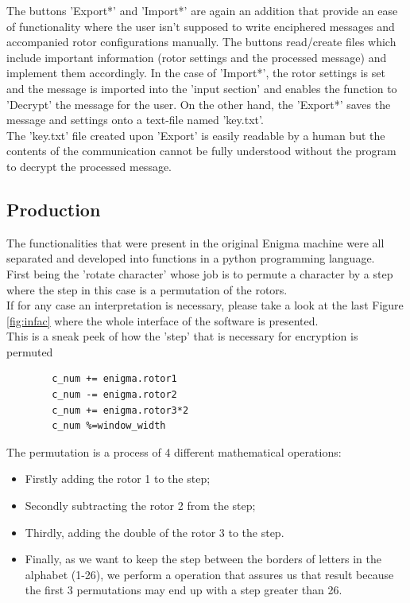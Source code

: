 \documentclass[conference,compsoc]{IEEEtran}
\begin{document}
The buttons 'Export*' and 'Import*' are again an addition that provide an ease of functionality where the user isn't supposed to write enciphered messages and accompanied rotor configurations manually. The buttons read/create files which include important information (rotor settings and the processed message) and implement them accordingly. In the case of 'Import*', the rotor settings is set and the message is imported into the 'input section' and enables the function to 'Decrypt' the message for the user. On the other hand, the 'Export*' saves the message and settings onto a text-file named 'key.txt'.\\

The 'key.txt' file created upon 'Export' is easily readable by a human but the contents of the communication cannot be fully understood without the program to decrypt the processed message.\\ 

\subsection{Production}

The functionalities that were present in the original Enigma machine were all separated and developed into functions in a python programming language.\\
First being the 'rotate character' whose job is to permute a character by a step where the step in this case is a permutation of the rotors.\\
If for any case an interpretation is necessary, please take a look at the last Figure \ref{fig:infac} where the whole interface of the software is presented.\\

This is a sneak peek of how the 'step' that is necessary for encryption is permuted
\begin{verbatim}
        c_num += enigma.rotor1
        c_num -= enigma.rotor2
        c_num += enigma.rotor3*2
        c_num %=window_width
\end{verbatim}
The permutation is a process of 4 different mathematical operations:\\
\begin{itemize}
    \item Firstly adding the rotor 1 to the step;\\
    \item Secondly subtracting the rotor 2 from the step;\\
    \item Thirdly, adding the double of the rotor 3 to the step.\\
    \item Finally, as we want to keep the step between the borders of letters in the alphabet (1-26), we perform a operation that assures us that result because the first 3 permutations may end up with a step greater than 26.\\
\end{itemize}
\end{document}
